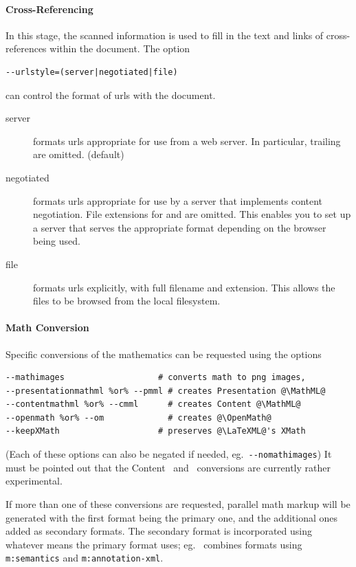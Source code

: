 \documentclass{book}
\newcommand{\shellcode}{\lstinline[style=shell]}
\begin{document}
\paragraph{Cross-Referencing}
In this stage, the scanned information is used to fill in the
text and links of cross-references within the document.
The option
\begin{lstlisting}[style=shell]
--urlstyle=(server|negotiated|file)
\end{lstlisting}
can control the format of urls with the document.
\begin{description}
  \item[server] formats urls appropriate for use from a web server.
    In particular, trailing  are omitted. (default)
  \item[negotiated] formats urls appropriate for use by a server
    that implements content negotiation. File extensions for 
    and  are omitted.  This enables you to set up a server
    that serves the appropriate format depending on the browser being used.
  \item[file] formats urls explicitly, with full filename and extension.
    This allows the files to be browsed from the local filesystem.
\end{description}

\paragraph{Math Conversion}
Specific conversions of the mathematics can be requested
using the options
\begin{lstlisting}[style=shell]
--mathimages                   # converts math to png images,
--presentationmathml %or% --pmml # creates Presentation @\MathML@
--contentmathml %or% --cmml      # creates Content @\MathML@
--openmath %or% --om             # creates @\OpenMath@
--keepXMath                    # preserves @\LaTeXML@'s XMath
\end{lstlisting}
(Each of these options can also be negated if needed, eg.~\shellcode{--nomathimages})
It must be pointed out that the Content \MathML\ and \OpenMath\
conversions are currently rather experimental.

If more than one of these conversions are requested,
parallel math markup will be generated with the first format
being the primary one, and the additional ones added as secondary formats.
The secondary format is incorporated using whatever means
the primary format uses; eg. \MathML\ combines formats using
\texttt{m:semantics} and \texttt{m:annotation-xml}.
\end{document}
